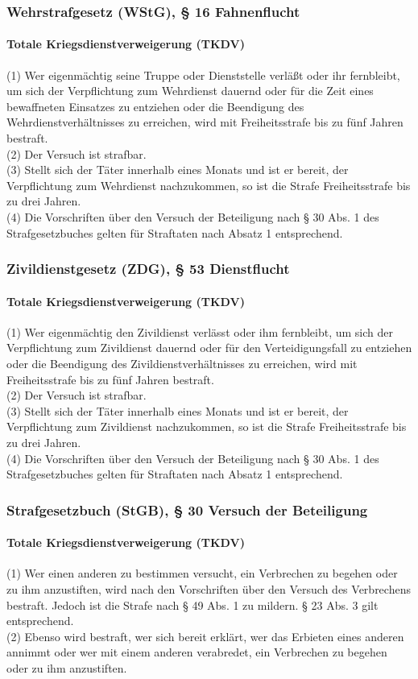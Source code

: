 \documentclass{beamer}
\begin{document}
	\begin{frame}
	  	\frametitle{Wehrstrafgesetz (WStG), § 16 Fahnenflucht}
	  	\framesubtitle{Totale Kriegsdienstverweigerung (TKDV)}
	  	(1) Wer eigenmächtig seine Truppe oder Dienststelle verläßt oder ihr fernbleibt, um sich der Verpflichtung zum Wehrdienst dauernd oder für die Zeit eines bewaffneten Einsatzes zu entziehen oder die Beendigung des Wehrdienstverhältnisses zu erreichen, wird mit Freiheitsstrafe bis zu fünf Jahren bestraft.\\
	  	(2) Der Versuch ist strafbar.\\
	  	(3) Stellt sich der Täter innerhalb eines Monats und ist er bereit, der Verpflichtung zum Wehrdienst nachzukommen, so ist die Strafe Freiheitsstrafe bis zu drei Jahren.\\
	  	(4) Die Vorschriften über den Versuch der Beteiligung nach § 30 Abs. 1 des Strafgesetzbuches gelten für Straftaten nach Absatz 1 entsprechend.
	\end{frame}
	
	\begin{frame}
	  	\frametitle{Zivildienstgesetz (ZDG), § 53 Dienstflucht}
	  	\framesubtitle{Totale Kriegsdienstverweigerung (TKDV)}
	  	(1) Wer eigenmächtig den Zivildienst verlässt oder ihm fernbleibt, um sich der Verpflichtung zum Zivildienst dauernd oder für den Verteidigungsfall zu entziehen oder die Beendigung des Zivildienstverhältnisses zu erreichen, wird mit Freiheitsstrafe bis zu fünf Jahren bestraft.\\
	  	(2) Der Versuch ist strafbar.\\
	  	(3) Stellt sich der Täter innerhalb eines Monats und ist er bereit, der Verpflichtung zum Zivildienst nachzukommen, so ist die Strafe Freiheitsstrafe bis zu drei Jahren.\\
	  	(4) Die Vorschriften über den Versuch der Beteiligung nach § 30 Abs. 1 des Strafgesetzbuches gelten für Straftaten nach Absatz 1 entsprechend.
	\end{frame}
	
	\begin{frame}
	  	\frametitle{Strafgesetzbuch (StGB), § 30 Versuch der Beteiligung}
	  	\framesubtitle{Totale Kriegsdienstverweigerung (TKDV)}
		(1) Wer einen anderen zu bestimmen versucht, ein Verbrechen zu begehen oder zu ihm anzustiften, wird nach den Vorschriften über den Versuch des Verbrechens bestraft. Jedoch ist die Strafe nach § 49 Abs. 1 zu mildern. § 23 Abs. 3 gilt entsprechend.\\
		(2) Ebenso wird bestraft, wer sich bereit erklärt, wer das Erbieten eines anderen annimmt oder wer mit einem anderen verabredet, ein Verbrechen zu begehen oder zu ihm anzustiften.
	\end{frame}
	
\end{document}
